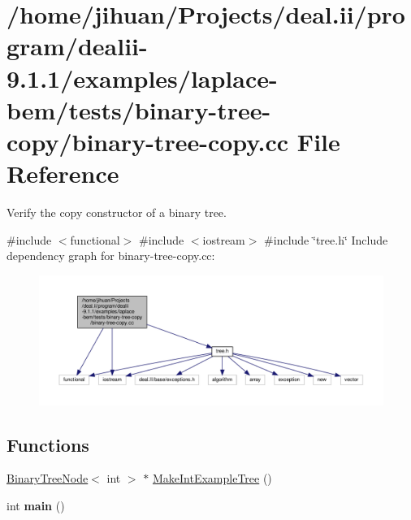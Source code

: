 \hypertarget{binary-tree-copy_8cc}{}\section{/home/jihuan/\+Projects/deal.ii/program/dealii-\/9.1.1/examples/laplace-\/bem/tests/binary-\/tree-\/copy/binary-\/tree-\/copy.cc File Reference}
\label{binary-tree-copy_8cc}


Verify the copy constructor of a binary tree.  


{\ttfamily \#include $<$functional$>$}\newline
{\ttfamily \#include $<$iostream$>$}\newline
{\ttfamily \#include \char`\"{}tree.\+h\char`\"{}}\newline
Include dependency graph for binary-\/tree-\/copy.cc\+:\nopagebreak
\begin{figure}[H]
\begin{center}
\leavevmode
\includegraphics[width=350pt]{binary-tree-copy_8cc__incl}
\end{center}
\end{figure}
\subsection*{Functions}
\begin{DoxyCompactItemize}
\item 
\hyperlink{classBinaryTreeNode}{Binary\+Tree\+Node}$<$ int $>$ $\ast$ \hyperlink{binary-tree-copy_8cc_ac883754e3b5ec7169c6d767f15641276}{Make\+Int\+Example\+Tree} ()
\item 
\mbox{\label{binary-tree-copy_8cc_ae66f6b31b5ad750f1fe042a706a4e3d4}} 
int {\bfseries main} ()
\end{DoxyCompactItemize}


